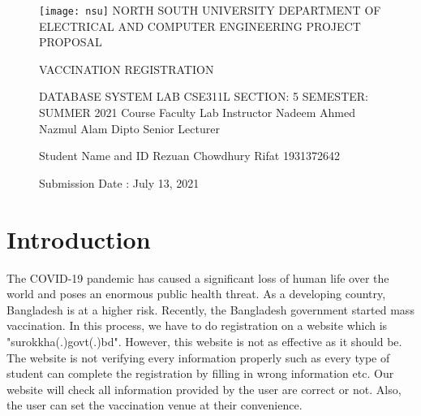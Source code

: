 \documentclass[15pt]{article}
\begin{document}
\begin{figure}[!t]
\centering
\texttt{[image: nsu]}
\break\break\break
{\LARGE N}{\Large ORTH}  {\LARGE S}{\Large OUTH}   {\LARGE U}{\Large NIVERSITY}
 \break
  {\large D}EPARTMENT OF {\large E}LECTRICAL AND {\large C}OMPUTER {\large E}NGINEERING
 \break\break
 {\Large P}{\large ROJECT} {\Large P}{\large ROPOSAL}
 \break\break

\begin{tcolorbox}[colback=white!5!white,colframe=black!75!black]
\centering
  {\huge V}{\LARGE ACCINATION}\hspace{.2cm} {\huge R}{\LARGE EGISTRATION} 
\end{tcolorbox}




\begin{introduction}
\centering
{\large D}ATABASE {\large S}YSTEM {\large L}AB \break
{\large CSE311L} \break
{\large S}ECTION: {\large 5} \break
{\large S}EMESTER: {\large S}UMMER {\large 2021} \break
\break\break\break
{\large Course Faculty }\hspace{6cm} {\large Lab Instructor} \break
{\large Nadeem Ahmed}\hspace{5cm} {\large Nazmul Alam Dipto} \break
{\large Senior Lecturer}\hspace{8.6cm} \break
\break\break


{\large Student Name and ID} \break
{\large Rezuan Chowdhury Rifat } \break
{\large 1931372642} \break





{\large Submission Date : July 13, 2021}
\end{introduction}
\break\break\break\break

\end{figure}

\newpage



\section*{Introduction}
The COVID-19 pandemic has caused a significant loss of human life over the world and poses an enormous public health threat. As a developing country, Bangladesh is at a higher risk. Recently, the Bangladesh government started mass vaccination. In this process, we have to do registration on a website which is "surokkha(.)govt(.)bd". However, this website is not as effective as it should be. The website is not verifying every information properly such as every type of student can complete the registration by filling in wrong information etc. Our website will check all information provided by the user are correct or not. Also, the user can set the vaccination venue at their convenience. 
\end{document}

